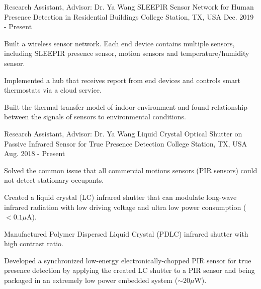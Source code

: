 

\begin{cventries}

  \cventry
    {Research Assistant, Advisor: Dr. Ya Wang} %
    {SLEEPIR Sensor Network for Human Presence Detection in Residential Buildings} %
    {College Station, TX, USA} %
    {Dec. 2019 - Present} %
    {
      \begin{cvitems} %
        \item Built a wireless sensor network. Each end device contains multiple sensors, including SLEEPIR presence sensor, motion sensors and temperature/humidity sensor.
        \item Implemented a hub that receives report from end devices and controls smart thermostats via a cloud service.
        \item Built the thermal transfer model of indoor environment and found relationship between the signals of sensors to environmental conditions.
      \end{cvitems}
    }
  \cventry
    {Research Assistant, Advisor: Dr. Ya Wang} %
    {Liquid Crystal Optical Shutter on Passive Infrared Sensor for True Presence Detection} %
    {College Station, TX, USA} %
    {Aug. 2018 - Present} %
    {
      \begin{cvitems} %
        \item Solved the common issue that all commercial motions sensors (PIR sensors) could not detect stationary occupants.
        \item Created a liquid crystal (LC) infrared shutter that can modulate long-wave infrared radiation with low driving voltage and ultra low power consumption ($<0.1\mu$A).
        \item Manufactured Polymer Dispersed Liquid Crystal (PDLC) infrared shutter with high contrast ratio.
        \item Developed a synchronized low-energy electronically-chopped PIR sensor for true presence detection by applying the created LC shutter to a PIR sensor and being packaged in an extremely low power embedded system ($\sim20\mu$W).

\end{cvitems}}
\end{cventries}
